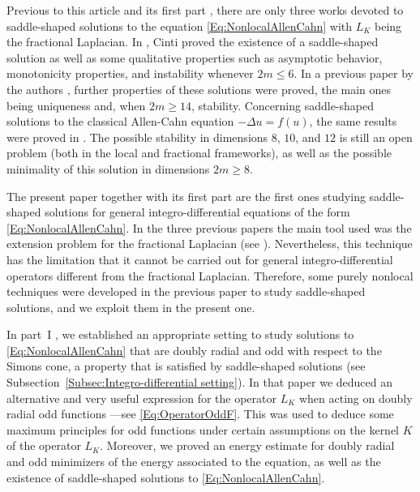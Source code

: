 \documentclass[12pt,reqno]{amsart}
\theoremstyle{definition}
\theoremstyle{remark}
\newcommand{\laplacian}{\Delta}
\numberwithin{equation}{section}
\begin{document}
Previous to this article and its first part \cite{FelipeSanz-Perela:IntegroDifferentialI}, there are only three works devoted to saddle-shaped solutions to the equation \eqref{Eq:NonlocalAllenCahn} with $L_K$ being the fractional Laplacian. In  \cite{Cinti-Saddle,Cinti-Saddle2}, Cinti proved the existence of a saddle-shaped solution as well as some qualitative properties such as asymptotic behavior, monotonicity properties, and instability whenever $2m\leq 6$. In a previous paper by the authors \cite{Felipe-Sanz-Perela:SaddleFractional}, further properties of these solutions were proved, the main ones being uniqueness and, when $2m\geq 14$, stability. Concerning saddle-shaped solutions to the classical Allen-Cahn equation $-\laplacian u = f(u)$, the same results were proved in \cite{DangFifePeletier, Schatzman, CabreTerraI,CabreTerraII, Cabre-Saddle}. The possible stability in dimensions $8$, $10$, and $12$ is still an open problem (both in the local and fractional frameworks), as well as the possible minimality of this solution in dimensions $2m \geq 8$.

The present paper together with its first part \cite{FelipeSanz-Perela:IntegroDifferentialI} are the first ones studying saddle-shaped solutions for general integro-differential equations of the form \eqref{Eq:NonlocalAllenCahn}. In the three previous papers \cite{Cinti-Saddle, Cinti-Saddle2, Felipe-Sanz-Perela:SaddleFractional} the main tool used was the extension problem for the fractional Laplacian (see \cite{CaffarelliSilvestre}). Nevertheless, this technique has the limitation that it cannot be carried out for general integro-differential operators different from the fractional Laplacian. Therefore, some purely nonlocal techniques were developed in the previous paper \cite{FelipeSanz-Perela:IntegroDifferentialI} to study saddle-shaped solutions, and we exploit them in the present one.

In part~I \cite{FelipeSanz-Perela:IntegroDifferentialI}, we established an appropriate setting to study solutions to \eqref{Eq:NonlocalAllenCahn} that are doubly radial and odd with respect to the Simons cone, a property that is satisfied by saddle-shaped solutions (see Subsection~\ref{Subsec:Integro-differential setting}). In that paper we deduced an alternative and very useful expression for the operator $L_K$ when acting on doubly radial odd functions ---see \eqref{Eq:OperatorOddF}. This was used to deduce some maximum principles for odd functions under certain assumptions on the kernel $K$ of the operator $L_K$. Moreover, we proved an energy estimate for doubly radial and odd minimizers of the energy associated to the equation, as well as the existence of saddle-shaped solutions to \eqref{Eq:NonlocalAllenCahn}.
\end{document}
